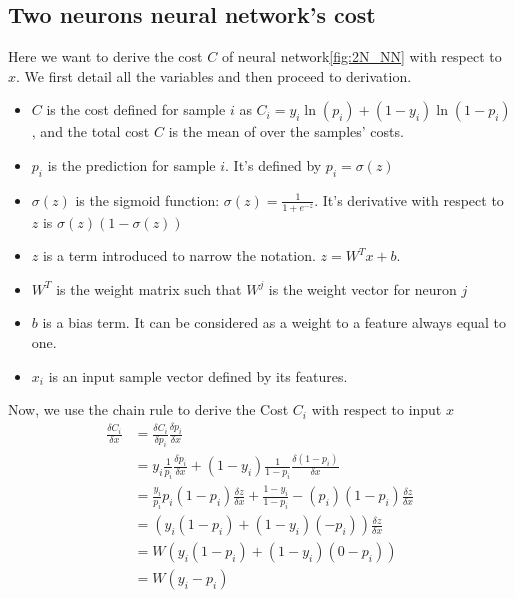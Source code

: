 
\begin{appendices}
	
	\section{Two neurons neural network's cost}
	\label{sec:2N_NN_cost}
		Here we want to derive the cost $C$ of neural network\ref{fig:2N_NN} with respect to $x$. We first detail all the variables and then proceed to derivation.
		\begin{itemize}
			\item $C$ is the cost defined for sample $i$ as $C_i = y_i \ln(p_i) + (1-y_i)\ln(1-p_i)$, and the total cost $C$ is the mean of over the samples' costs.
			\item $p_i$ is the prediction for sample $i$. It's defined by $p_i = \sigma(z)$
			\item $\sigma(z)$ is the sigmoid function: $\sigma(z) = \frac{1}{1 + e^{-z}}$. It's derivative with respect to $z$ is $\sigma(z)(1-\sigma(z))$
			\item $z$ is a term introduced to narrow the notation. $z=W^Tx+b$.
			\item $W^T$ is the weight matrix such that $W^j$ is the weight vector for neuron $j$
			\item $b$ is a bias term. It can be considered as a weight to a feature always equal to one.
			\item $x_i$ is an input sample vector defined by its features.
		\end{itemize}
		Now, we use the chain rule to derive the Cost $C_i$ with respect to input $x$
		\begin{equation}
			\begin{split}
				\frac{\delta C_i}{\delta x} &= \frac{\delta C_i}{\delta p_i} \frac{\delta p_i}{\delta x} \\
				&= y_i \frac{1}{p_i} \frac{\delta p_i}{\delta x} + (1-y_i)\frac{1}{1-p_i} \frac{\delta (1-p_i)}{\delta x} \\
				&= \frac{y_i}{p_i} p_i(1-p_i)\frac{\delta z}{\delta x} + \frac{1-y_i}{1-p_i} -(p_i)(1-p_i) \frac{\delta z}{\delta x} \\
				&= \left( y_i (1-p_i) + (1-y_i) (-p_i)   \right) \frac{\delta z}{\delta x} \\
				&= W \left( y_i (1-p_i) + (1-y_i) (0-p_i)  \right)  \\
				&= W \left( y_i -p_i                       \right)
			\end{split}
		\end{equation}




\end{appendices}
